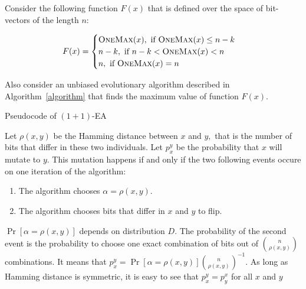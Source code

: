 \documentclass{article}
\newcommand{\OM}{\textsc{OneMax}\xspace}
\begin{document}
Consider the following function $F(x)$ that is defined over the space of bit-vectors of the length $n$:

\begin{align*}
  F(x) =
  \begin{cases}
    \OM(x), \text{ if } \OM(x) \le n - k \\
    n - k, \text{ if } n - k < \OM(x) < n \\
    n, \text{ if } \OM(x) = n \\
  \end{cases}
\end{align*}

Also consider an unbiased evolutionary algorithm described in Algorithm~\ref{algorithm} that finds the maximum value of function $F(x)$.

\begin{algorithm}[!t]
\begin{center}
    \begin{algorithmic}[1]
            \EndIf
        \EndWhile
    \end{algorithmic}
    \caption{Pseudocode of $(1 + 1)$-EA}
    \label{algorithm}
\end{center}
\end{algorithm}

Let $\rho(x, y)$ be the Hamming distance between $x$ and $y,$ that is the number of bits that differ in these two individuals. Let $p_x^y$ be the probability that $x$ will mutate to $y$. This mutation happens if and only if the two following events occure on one iteration of the algorithm:

\begin{enumerate}
  \item The algorithm chooses $\alpha = \rho(x, y).$
  \item The algorithm chooses bits that differ in $x$ and $y$ to flip.
\end{enumerate}

$\Pr[\alpha = \rho(x, y)]$ depends on distribution $D$. The probability of the second event is the probability to choose one exact combination of bits out of $\binom{n}{\rho(x, y)}$ combinations. It means that $p_x^y = \Pr[\alpha = \rho(x, y)]\binom{n}{\rho(x, y)}^{-1}$. As long as Hamming distance is symmetric, it is easy to see that $p_x^y = p_y^x$ for all $x$ and $y$
\end{document}
